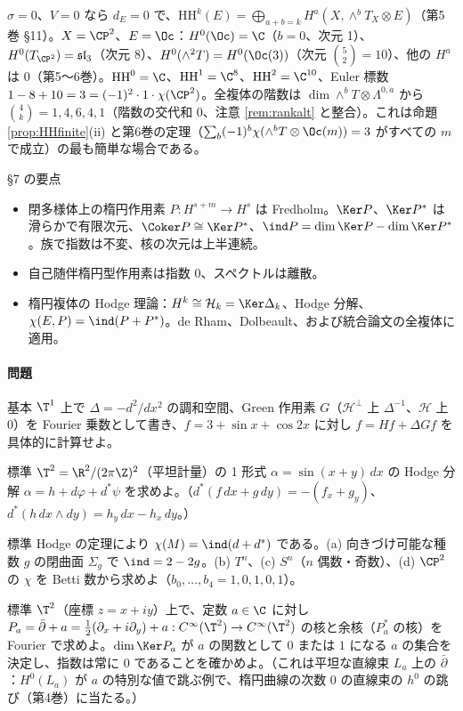 \begin{ex}[$\CP^2$、$E=\Oc$、$\sigma=0$]\label{ex:CP2}
$\sigma=0$、$V=0$ なら $d_E=0$ で、$\mathrm{HH}^k(E)=\bigoplus_{a+b=k}H^a(X,\wedge^bT_X\otimes E)$（第5巻 \S11）。$X=\CP^2$、$E=\Oc$：$H^0(\Oc)=\C$（$b=0$、次元 1）、$H^0(T_{\CP^2})=\mathfrak{sl}_3$（次元 8）、$H^0(\wedge^2T)=H^0(\Oc(3))$（次元 $\binom52=10$）、他の $H^a$ は $0$（第5〜6巻）。$\mathrm{HH}^0=\C$、$\mathrm{HH}^1=\C^8$、$\mathrm{HH}^2=\C^{10}$、Euler 標数 $1-8+10=3=(-1)^2\cdot1\cdot\chi(\CP^2)$。全複体の階数は $\dim\wedge^b T\otimes\Lambda^{0,a}$ から $\binom4k=1,4,6,4,1$（階数の交代和 $0$、注意 \ref{rem:rankalt} と整合）。これは命題 \ref{prop:HHfinite}(ii) と第6巻の定理（$\sum_b(-1)^b\chi(\wedge^bT\otimes\Oc(m))=3$ がすべての $m$ で成立）の最も簡単な場合である。
\end{ex}

\begin{keybox}{§7 の要点}
\begin{itemize}
\item 閉多様体上の楕円作用素 $P:H^{s+m}\to H^s$ は Fredholm。$\Ker P$、$\Ker P^*$ は滑らかで有限次元、$\Coker P\cong\Ker P^*$、$\ind P=\dim\Ker P-\dim\Ker P^*$。族で指数は不変、核の次元は上半連続。
\item 自己随伴楕円型作用素は指数 $0$、スペクトルは離散。
\item 楕円複体の Hodge 理論：$H^k\cong\mathcal H_k=\Ker\Delta_k$、Hodge 分解、$\chi(E,P)=\ind(P+P^*)$。de Rham、Dolbeault、および統合論文の全複体に適用。
\end{itemize}
\end{keybox}
\paragraph{問題}
\begin{prob}{基本}\label{p:green1}
$\T^1$ 上で $\Delta=-d^2/dx^2$ の調和空間、Green 作用素 $G$（$\mathcal H^\perp$ 上 $\Delta^{-1}$、$\mathcal H$ 上 $0$）を Fourier 乗数として書き、$f=3+\sin x+\cos 2x$ に対し $f=Hf+\Delta Gf$ を具体的に計算せよ。
\end{prob}
\begin{prob}{標準}\label{p:hodge1form}
$\T^2=\R^2/(2\pi\Z)^2$（平坦計量）の 1 形式 $\alpha=\sin(x+y)\,dx$ の Hodge 分解 $\alpha=h+d\varphi+d^*\psi$ を求めよ。（$d^*(f\,dx+g\,dy)=-(f_x+g_y)$、$d^*(h\,dx\wedge dy)=h_y\,dx-h_x\,dy$。）
\end{prob}
\begin{prob}{標準}\label{p:chiind}
Hodge の定理により $\chi(M)=\ind(d+d^*)$ である。(a) 向きづけ可能な種数 $g$ の閉曲面 $\Sigma_g$ で $\ind=2-2g$。(b) $T^n$、(c) $S^n$（$n$ 偶数・奇数）、(d) $\CP^2$ の $\chi$ を Betti 数から求めよ（$b_0,\dots,b_4=1,0,1,0,1$）。
\end{prob}
\begin{prob}{標準}\label{p:torusa}
$\T^2$（座標 $z=x+iy$）上で、定数 $a\in\C$ に対し $P_a=\bar\partial+a=\frac12(\partial_x+i\partial_y)+a:C^\infty(\T^2)\to C^\infty(\T^2)$ の核と余核（$P_a^*$ の核）を Fourier で求めよ。$\dim\Ker P_a$ が $a$ の関数として $0$ または $1$ になる $a$ の集合を決定し、指数は常に $0$ であることを確かめよ。（これは平坦な直線束 $L_a$ 上の $\bar\partial$：$H^0(L_a)$ が $a$ の特別な値で跳ぶ例で、楕円曲線の次数 $0$ の直線束の $h^0$ の跳び（第4巻）に当たる。）
\end{prob}
